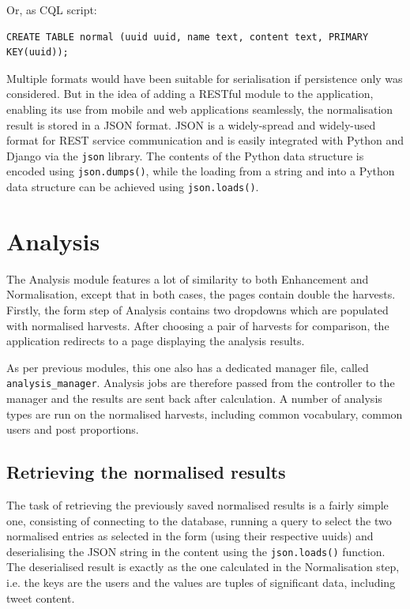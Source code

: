 Or, as CQL script:
\begin{lstlisting}
CREATE TABLE normal (uuid uuid, name text, content text, PRIMARY KEY(uuid));
\end{lstlisting}

Multiple formats would have been suitable for serialisation if persistence only was considered. But in the idea of adding a RESTful module to the application, enabling its use from mobile and web applications seamlessly, the normalisation result is stored in a JSON format. JSON is a widely-spread and widely-used format for REST service communication and is easily integrated with Python and Django via the \texttt{json} library. The contents of the Python data structure is encoded using \texttt{json.dumps()}, while the loading from a string and into a Python data structure can be achieved using \texttt{json.loads()}.

\section{Analysis}
The Analysis module features a lot of similarity to both Enhancement and Normalisation, except that in both cases, the pages contain double the harvests. Firstly, the form step of Analysis contains two dropdowns which are populated with normalised harvests. After choosing a pair of harvests for comparison, the application redirects to a page displaying the analysis results.

As per previous modules, this one also has a dedicated manager file, called \texttt{analysis\_manager}. Analysis jobs are therefore passed from the controller to the manager and the results are sent back after calculation. A number of analysis types are run on the normalised harvests, including common vocabulary, common users and post proportions.

\subsection{Retrieving the normalised results}
The task of retrieving the previously saved normalised results is a fairly simple one, consisting of connecting to the database, running a query to select the two normalised entries as selected in the form (using their respective uuids) and deserialising the JSON string in the content using the \texttt{json.loads()} function. The deserialised result is exactly as the one calculated in the Normalisation step, i.e. the keys are the users and the values are tuples of significant data, including tweet content.

